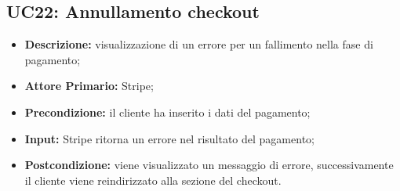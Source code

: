 \subsection{UC22: Annullamento checkout}
\label{sec:UC22}
\begin{itemize}
    \item \textbf{Descrizione:} visualizzazione di un errore per un fallimento nella fase di pagamento;
    \item \textbf{Attore Primario:} Stripe;
    \item \textbf{Precondizione:} il cliente ha inserito i dati del pagamento;
    \item \textbf{Input:} Stripe ritorna un errore nel risultato del pagamento;
    \item \textbf{Postcondizione:} viene visualizzato un messaggio di errore, successivamente il cliente viene reindirizzato alla sezione del checkout.
\end{itemize}
